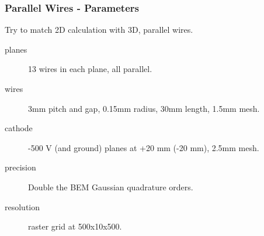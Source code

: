 \documentclass[xcolor=dvipsnames]{beamer}
\begin{document}


\begin{frame}
  \frametitle{Parallel Wires - Parameters}
  Try to match 2D calculation with 3D, parallel wires.
  \begin{description}
  \item[planes] 13 wires in each plane, all parallel.
  \item[wires] 3mm pitch and gap, 0.15mm radius, 30mm length, 1.5mm mesh.
  \item[cathode] -500 V (and ground) planes at +20 mm (-20 mm), 2.5mm mesh.
  \item[precision] Double the BEM Gaussian quadrature orders.
  \item[resolution] raster grid at 500x10x500.
  \end{description}
\end{frame}
\end{document}
